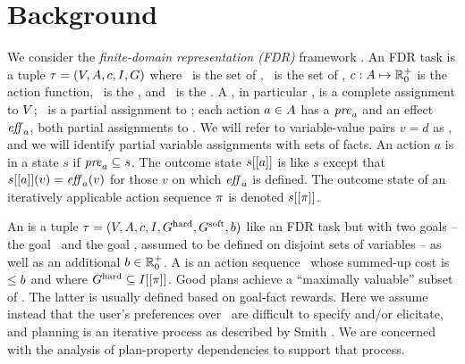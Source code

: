 \section{Background}
\label{background}



We consider the \emph{finite-domain representation (FDR)} framework
\cite{backstrom:nebel:ci-95,helmert:ai-09}.
%
An FDR task  is a tuple $\tau =
(V,A,{c},I,G)$ where \vars\ is the set of
, \acts\ is the set of , ${c}:
A \mapsto {\mathbb{R}}^+_0$ is the action  function,
\init\ is the , and \goal\ is the
. A , in particular \init, is a complete
assignment to $V$; \goal\ is a partial assignment to \vars; each
action $a \in A$ has a  $\mathit{pre}_a$ and an
effect $\mathit{eff}_a$, both partial assignments to \vars. We will refer to
variable-value pairs $v=d$ as , and we will identify
partial variable assignments with sets of facts.
%
An action $a$ is  in a state $s$ if $\mathit{pre}_a
\subseteq s$. The outcome state $s[[a]]$ is like $s$ except that
$s[[a]](v) = \mathit{eff}_a(v)$ for those $v$ on which $\mathit{eff}_a$ is
defined. The outcome state of an iteratively applicable action
sequence $\pi$ is denoted $s[[\pi]]$.

An  is a tuple $\tau =
(V,\allowbreak A,\allowbreak{\ensuremath{c}},\allowbreak I,\allowbreak G^{\text{\textup{hard}}},\allowbreak G^{\text{\textup{soft}}},\allowbreak{\ensuremath{b}})$
like an FDR task but with two goals -- the  goal
\goalhard\ and the  goal \goalsoft, assumed to be
defined on disjoint sets of variables -- as well as an additional
 ${b} \in {\mathbb{R}}^+_0$. A  is
an action sequence \plan\ whose summed-up cost is $\leq {\ensuremath{b}}$
and where $G^{\text{\textup{hard}}} \subseteq I[[\pi]]$. Good plans achieve
a ``maximally valuable'' subset of \goalsoft. The latter is usually
defined based on goal-fact rewards. Here we assume instead that the
user's preferences over \goalsoft\ are difficult to specify and/or
elicitate, and planning is an iterative process as described by Smith
. We are concerned with the analysis of
plan-property dependencies to support that process.

